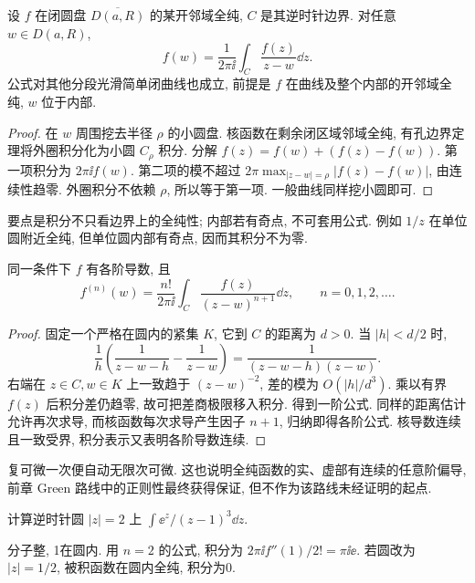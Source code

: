 \begin{theorem}\label{thm:cauchy}
设 $f$ 在闭圆盘 $\overline{D(a,R)}$ 的某开邻域全纯, $C$ 是其逆时针边界. 对任意 $w\in D(a,R)$,
\[
f(w)=\frac1{2\pi\ii}\int_C\frac{f(z)}{z-w}\dd z.
\]
公式对其他分段光滑简单闭曲线也成立, 前提是 $f$ 在曲线及整个内部的开邻域全纯, $w$ 位于内部.
\end{theorem}
\begin{proof}
在 $w$ 周围挖去半径 $\rho$ 的小圆盘. 核函数在剩余闭区域邻域全纯, 有孔边界定理将外圈积分化为小圆 $C_\rho$ 积分. 分解 $f(z)=f(w)+(f(z)-f(w))$. 第一项积分为 $2\pi\ii f(w)$. 第二项的模不超过 $2\pi\max_{|z-w|=\rho}|f(z)-f(w)|$, 由连续性趋零. 外圈积分不依赖 $\rho$, 所以等于第一项. 一般曲线同样挖小圆即可.
\end{proof}
要点是积分不只看边界上的全纯性; 内部若有奇点, 不可套用公式. 例如 $1/z$ 在单位圆附近全纯, 但单位圆内部有奇点, 因而其积分不为零.
\begin{theorem}[导数公式]\label{thm:derivcauchy}
同一条件下 $f$ 有各阶导数, 且
\[
f^{(n)}(w)=\frac{n!}{2\pi\ii}\int_C\frac{f(z)}{(z-w)^{n+1}}\dd z,\qquad n=0,1,2,\ldots.
\]
\end{theorem}
\begin{proof}
固定一个严格在圆内的紧集 $K$, 它到 $C$ 的距离为 $d>0$. 当 $|h|<d/2$ 时,
\[
\frac{1}{h}\left(\frac1{z-w-h}-\frac1{z-w}\right)=\frac1{(z-w-h)(z-w)}.
\]
右端在 $z\in C,w\in K$ 上一致趋于 $(z-w)^{-2}$, 差的模为 $O(|h|/d^3)$. 乘以有界 $f(z)$ 后积分差仍趋零, 故可把差商极限移入积分. 得到一阶公式. 同样的距离估计允许再次求导, 而核函数每次求导产生因子 $n+1$, 归纳即得各阶公式. 核导数连续且一致受界, 积分表示又表明各阶导数连续.
\end{proof}
复可微一次便自动无限次可微. 这也说明全纯函数的实、虚部有连续的任意阶偏导, 前章 Green 路线中的正则性最终获得保证, 但不作为该路线未经证明的起点.
\begin{example}
计算逆时针圆 $|z|=2$ 上 $\int\ee^z/(z-1)^3\dd z$.
\end{example}
\begin{solution}
分子整, 1在圆内. 用 $n=2$ 的公式, 积分为 $2\pi\ii f''(1)/2!=\pi\ii\ee$. 若圆改为 $|z|=1/2$, 被积函数在圆内全纯, 积分为0.
\end{solution}

